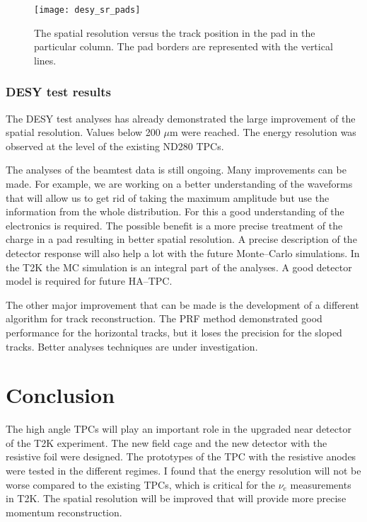 \documentclass[../main.tex]{subfiles}
\begin{document}
\begin{figure}[!ht]
  \centering
  \texttt{[image: desy\_sr\_pads]}
  \caption{The spatial resolution versus the track position in the pad in the particular column. The pad borders are represented with the vertical lines.}
  \label{fig:tpc:sr_pad}
\end{figure}

\subsubsection{DESY test results}
The DESY test analyses has already demonstrated the large improvement of the spatial resolution. Values below 200 $\mu\text{m}$ were reached. The energy resolution was observed at the level of the existing ND280 TPCs.

The analyses of the beamtest data is still ongoing. Many improvements can be made. For example, we are working on a better understanding of the waveforms that will allow us to get rid of taking the maximum amplitude but use the information from the whole distribution. For this a good understanding of the electronics is required. The possible benefit is a more precise treatment of the charge in a pad resulting in better spatial resolution. A precise description of the detector response will also help a lot with the future Monte--Carlo simulations. In the T2K the MC simulation is an integral part of the analyses. A good detector model is required for future HA--TPC.

The other major improvement that can be made is the development of a different algorithm for track reconstruction. The PRF method demonstrated good performance for the horizontal tracks, but it loses the precision for the sloped tracks. Better analyses techniques are under investigation.

\section{Conclusion}
The high angle TPCs will play an important role in the upgraded near detector of the T2K experiment. The new field cage and the new detector with the resistive foil were designed. The prototypes of the TPC with the resistive anodes were tested in the different regimes. I found that the energy resolution will not be worse compared to the existing TPCs, which is critical for the $\nu_e$ measurements in T2K. The spatial resolution will be improved that will provide more precise momentum reconstruction.
\end{document}
